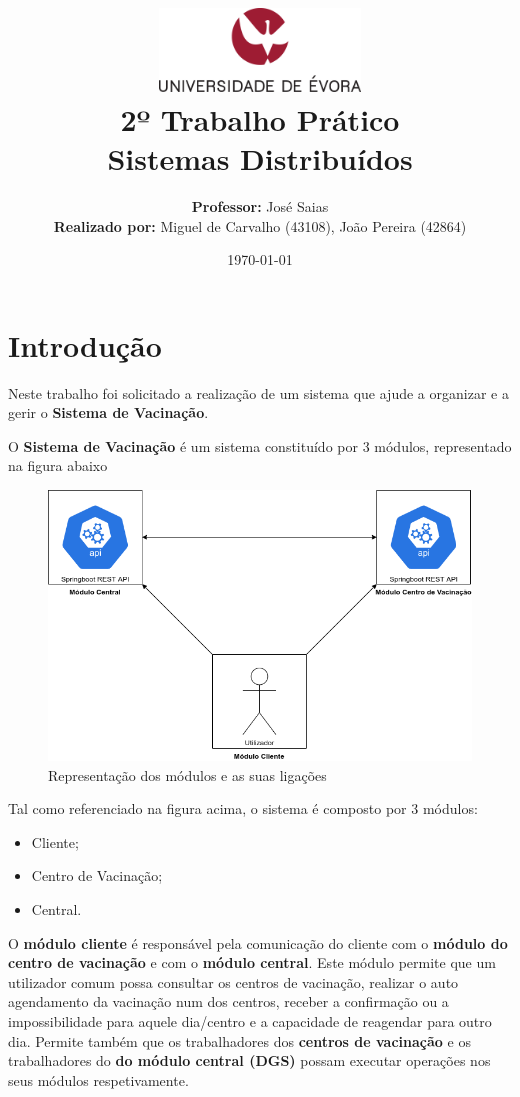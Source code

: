 \documentclass[11pt]{article}
\title
{
    \includegraphics[width=0.4\textwidth]{imgs/university.png}
    \\[0.1cm]
    \textbf{2º Trabalho Prático} \\
    Sistemas Distribuídos
}
\author
{
    \textbf{Professor:} José Saias \\
    \textbf{Realizado por:} Miguel de Carvalho (43108), João Pereira (42864) 
}
\date{\today}
\begin{document}
\maketitle

\section{Introdução}

\hspace{0.6cm}Neste trabalho foi solicitado a realização de um sistema que ajude a organizar e a gerir o \textbf{Sistema de Vacinação}.

O \textbf{Sistema de Vacinação} é um sistema constituído por 3 módulos, representado na figura abaixo

\begin{figure}[h]
    \includegraphics[width=1\textwidth]{imgs/sd.png}
    \centering
    \caption{Representação dos módulos e as suas ligações}
\end{figure}

\hfill

Tal como referenciado na figura acima, o sistema é composto por 3 módulos:
\begin{itemize}
    \item Cliente;
    \item Centro de Vacinação;
    \item Central.
\end{itemize}

\hfill

O \textbf{módulo cliente} é responsável pela comunicação do cliente com o \textbf{módulo do centro de vacinação} e com o \textbf{módulo central}. Este módulo permite que um utilizador comum possa consultar os centros de vacinação, realizar o auto agendamento da vacinação num dos centros, receber a confirmação ou a impossibilidade para aquele dia/centro e a capacidade de reagendar para outro dia. Permite também que os trabalhadores dos \textbf{centros de vacinação} e os trabalhadores do \textbf{do módulo central (DGS)} possam executar operações nos seus módulos respetivamente. 
\end{document}
